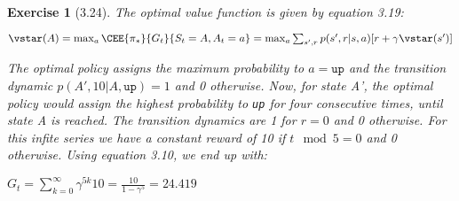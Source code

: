 \documentclass[a4paper]{scrartcl}
\theoremstyle{nonumberplain}
\newtheorem{ex}{Exercise}
\begin{document}
\begin{ex}[3.24]
The optimal value function is given by equation 3.19:

$\vstar(A)=\max_a \CEE{\pi_*}{G_t}{S_t=A,A_t=a}= \max_a\sum_{s',r} p(s',r|s,a) [r+\gamma \vstar(s')]$

The optimal policy assigns the maximum probability to $a=\texttt{up}$ and the transition dynamic $p(A',10|A,\texttt{up})=1$ and 0 otherwise. Now, for state A', the optimal policy would assign the highest probability to \texttt{up} for four consecutive times, until state A is reached. The transition dynamics are 1 for $r=0$ and 0 otherwise. For this infite series we have a constant reward of 10 if $t\mod5=0$ and 0 otherwise. Using equation 3.10, we end up with:

$G_t=\sum_{k=0}^{\infty} \gamma^{5k}10 = \frac{10}{1-\gamma^5}=24.419$

\end{ex}
\end{document}
